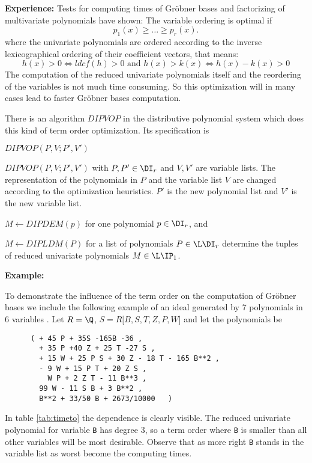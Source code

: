 {\bf Experience:}
Tests for computing times of Gr\"obner bases and
factorizing of multivariate polynomials have shown:
The variable ordering is optimal if
\begin{displaymath}
        p_1 (x) \geq \ldots \geq p_r (x).
\end{displaymath}
where the univariate polynomials are ordered according
to the inverse lexicographical ordering of their
coefficient vectors, that means:
\begin{displaymath}
        h(x) > 0     \Longleftrightarrow  ldcf(h) > 0
        \mbox{\ \  and \ \ }
        h(x) > k(x)  \Longleftrightarrow  h(x) - k(x) > 0%
\end{displaymath}
The computation of the reduced univariate polynomials itself 
and the reordering of the variables is not much time consuming.
So this optimization will in many cases lead to 
faster Gr\"obner bases computation. 

There is an algorithm $DIPVOP$ in the distributive polynomial 
system which does this kind of term order optimization. 
Its specification is 

\begin{deflist}{$DIPVOP(P,V; P', V')$}
\item[$DIPVOP(P,V; P', V')$] with $P, P' \in \DI_r$ and 
      $V, V'$ are variable lists. The representation of the 
      polynomials in $P$ and the variable list $V$ are changed 
      according to the optimization heuristics. 
      $P'$ is the new polynomial list and $V'$ is the new 
      variable list.
\item[$M \gets DIPDEM(p)$] for one polynomial $p \in \DI_r$,
      and 
\item[$M \gets DIPLDM(P)$] for a list of polynomials 
      $P \in \L\DI_r$ determine the tuples 
      of reduced univariate polynomials $M \in \L\IP_1$.
\end{deflist}


{\bf Example:}

\label{ex:trinks}
To demonstrate the influence of the term order on the computation
of Gr\"obner bases we include the following example of an
ideal generated by
7 polynomials in 6 variables \cite{Trinks 78}.
Let $R = \Q$, $S = R \lbrack B, S, T, Z, P, W \rbrack$ 
and let the polynomials be
\begin{verbatim}
      ( + 45 P + 35S -165B -36 ,
        + 35 P +40 Z + 25 T -27 S ,
        + 15 W + 25 P S + 30 Z - 18 T - 165 B**2 ,
        - 9 W + 15 P T + 20 Z S ,
          W P + 2 Z T - 11 B**3 ,
        99 W - 11 S B + 3 B**2 ,
        B**2 + 33/50 B + 2673/10000   )
\end{verbatim}
In table \ref{tab:timeto} the dependence is clearly visible.
The reduced univariate polynomial for variable \verb/B/ 
has degree $3$, so a term order where \verb/B/ is smaller 
than all other variables will be most desirable. 
Observe that as more right \verb/B/ stands in the 
variable list as worst become the computing times.


